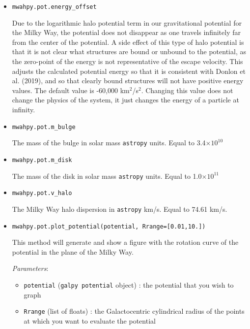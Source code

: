 \documentclass{article}
\begin{document}
\begin{itemize}

\item \verb!mwahpy.pot.energy_offset!

Due to the logarithmic halo potential term in our gravitational potential for the Milky Way, the potential does not disappear as one travels infinitely far from the center of the potential. A side effect of this type of halo potential is that it is not clear what structures are bound or unbound to the potential, as the zero-point of the energy is not representative of the escape velocity. This adjusts the calculated potential energy so that it is consistent with Donlon et al. (2019), and so that clearly bound structures will not have positive energy values. The default value is -60,000 km$^2$/s$^2$. Changing this value does not change the physics of the system, it just changes the energy of a particle at infinity. 

\item \verb!mwahpy.pot.m_bulge!

The mass of the bulge in solar mass \verb!astropy! units. Equal to 3.4$\times10^{10}$ \msol

\item \verb!mwahpy.pot.m_disk!

The mass of the disk in solar mass \verb!astropy! units. Equal to 1.0$\times10^{11}$ \msol

\item \verb!mwahpy.pot.v_halo!

The Milky Way halo dispersion in \verb!astropy! km/s. Equal to 74.61 km/s.

\item \verb!mwahpy.pot.plot_potential(potential, Rrange=[0.01,10.])!

This method will generate and show a figure with the rotation curve of the potential in the plane of the Milky Way. 

\textit{Parameters}: \begin{itemize}

\item \verb!potential! (\verb!galpy potential! object) : the potential that you wish to graph 

\item \verb!Rrange! (list of floats) : the Galactocentric cylindrical radius of the points at which you want to evaluate the potential

\end{itemize}


\end{itemize}
\end{document}

